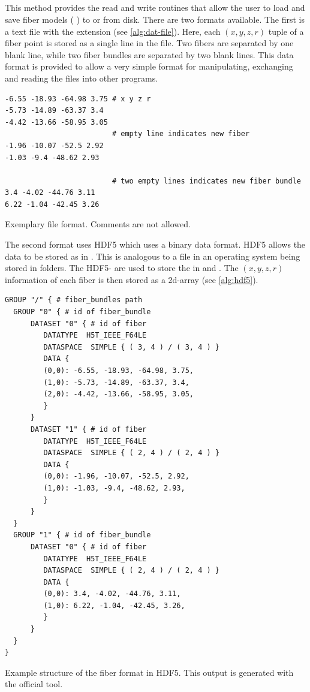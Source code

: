 \subsection{}
%
This method provides the read and write routines that allow the user to load and save fiber models (\ie{} ) to or from disk.
There are two formats available.
The first is a text file with the extension  (see \cref{alg:dat-file}).
Here, each $(x,y,z,r)$ tuple of a fiber point is stored as a single line in the file.
Two fibers are separated by one blank line, while two fiber bundles are separated by two blank lines.
This data format is provided to allow a very simple format for manipulating, exchanging and \eg{} reading the files into other programs.
\par
%
\begin{lstfloat}[!ht]
\begin{lstlisting}
-6.55 -18.93 -64.98 3.75 # x y z r
-5.73 -14.89 -63.37 3.4
-4.42 -13.66 -58.95 3.05
                         # empty line indicates new fiber
-1.96 -10.07 -52.5 2.92
-1.03 -9.4 -48.62 2.93

                         # two empty lines indicates new fiber bundle
3.4 -4.02 -44.76 3.11
6.22 -1.04 -42.45 3.26
\end{lstlisting}
\caption{Exemplary  file format. Comments are not allowed.}\label{alg:dat-file}
\end{lstfloat}
%
The second format uses \ac{HDF5} \cite{hdf5} which uses a binary data format.
\ac{HDF5} allows the data to be stored as  in .
This is analogous to a file in an operating system being stored in folders.
The \ac{HDF5}- are used to store the  in  and .
The $(x,y,z,r)$ information of each fiber is then stored as a 2d-array (see \cref{alg:hdf5}).
%
\begin{lstfloat}[!ht]
\begin{lstlisting}
GROUP "/" { # fiber_bundles path
  GROUP "0" { # id of fiber_bundle
      DATASET "0" { # id of fiber
         DATATYPE  H5T_IEEE_F64LE
         DATASPACE  SIMPLE { ( 3, 4 ) / ( 3, 4 ) }
         DATA {
         (0,0): -6.55, -18.93, -64.98, 3.75,
         (1,0): -5.73, -14.89, -63.37, 3.4,
         (2,0): -4.42, -13.66, -58.95, 3.05,
         }
      }
      DATASET "1" { # id of fiber
         DATATYPE  H5T_IEEE_F64LE
         DATASPACE  SIMPLE { ( 2, 4 ) / ( 2, 4 ) }
         DATA {
         (0,0): -1.96, -10.07, -52.5, 2.92,
         (1,0): -1.03, -9.4, -48.62, 2.93,
         }
      }
  }
  GROUP "1" { # id of fiber_bundle
      DATASET "0" { # id of fiber
         DATATYPE  H5T_IEEE_F64LE
         DATASPACE  SIMPLE { ( 2, 4 ) / ( 2, 4 ) }
         DATA {
         (0,0): 3.4, -4.02, -44.76, 3.11,
         (1,0): 6.22, -1.04, -42.45, 3.26,
         }
      }
  }
}
\end{lstlisting}
\caption{Example structure of the fiber format in \ac{HDF5}. This output is generated with the official  tool.}
\label{alg:hdf5}
\end{lstfloat}
%
%
%
